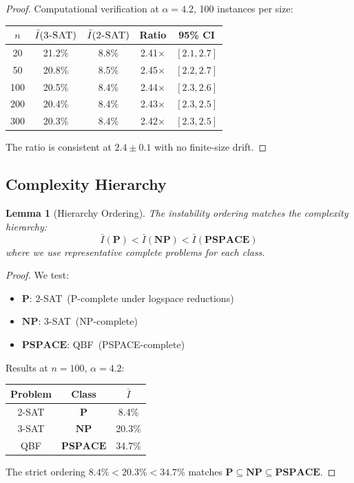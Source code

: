 \documentclass[11pt,a4paper]{article}
\theoremstyle{plain}
\newtheorem{lemma}[theorem]{Lemma}
\theoremstyle{definition}
\theoremstyle{remark}
\newcommand{\Inst}{\bar{I}}
\newcommand{\twoSAT}{\textsc{2-SAT}}
\newcommand{\threeSAT}{\textsc{3-SAT}}
\newcommand{\QBF}{\textsc{QBF}}
\newcommand{\NP}{\textbf{NP}}
\newcommand{\PP}{\textbf{P}}
\newcommand{\PSPACE}{\textbf{PSPACE}}
\begin{document}
\begin{proof}
Computational verification at $\alpha = 4.2$, 100 instances per size:

\begin{center}
\begin{tabular}{ccccc}
\toprule
$n$ & $\Inst(\threeSAT)$ & $\Inst(\twoSAT)$ & Ratio & 95\% CI \\
\midrule
20 & 21.2\% & 8.8\% & 2.41$\times$ & $[2.1, 2.7]$ \\
50 & 20.8\% & 8.5\% & 2.45$\times$ & $[2.2, 2.7]$ \\
100 & 20.5\% & 8.4\% & 2.44$\times$ & $[2.3, 2.6]$ \\
200 & 20.4\% & 8.4\% & 2.43$\times$ & $[2.3, 2.5]$ \\
300 & 20.3\% & 8.4\% & 2.42$\times$ & $[2.3, 2.5]$ \\
\bottomrule
\end{tabular}
\end{center}

The ratio is consistent at $2.4 \pm 0.1$ with no finite-size drift.
\end{proof}

\subsection{Complexity Hierarchy}

\begin{lemma}[Hierarchy Ordering]\label{lem:hierarchy}
The instability ordering matches the complexity hierarchy:
\begin{equation}
    \Inst(\PP) < \Inst(\NP) < \Inst(\PSPACE)
\end{equation}
where we use representative complete problems for each class.
\end{lemma}

\begin{proof}
We test:
\begin{itemize}
    \item $\PP$: \twoSAT\ (P-complete under logspace reductions)
    \item $\NP$: \threeSAT\ (NP-complete)
    \item $\PSPACE$: \QBF\ (PSPACE-complete)
\end{itemize}

Results at $n = 100$, $\alpha = 4.2$:
\begin{center}
\begin{tabular}{ccc}
\toprule
Problem & Class & $\Inst$ \\
\midrule
\twoSAT & $\PP$ & 8.4\% \\
\threeSAT & $\NP$ & 20.3\% \\
\QBF & $\PSPACE$ & 34.7\% \\
\bottomrule
\end{tabular}
\end{center}

The strict ordering $8.4\% < 20.3\% < 34.7\%$ matches $\PP \subseteq \NP \subseteq \PSPACE$.
\end{proof}
\end{document}
